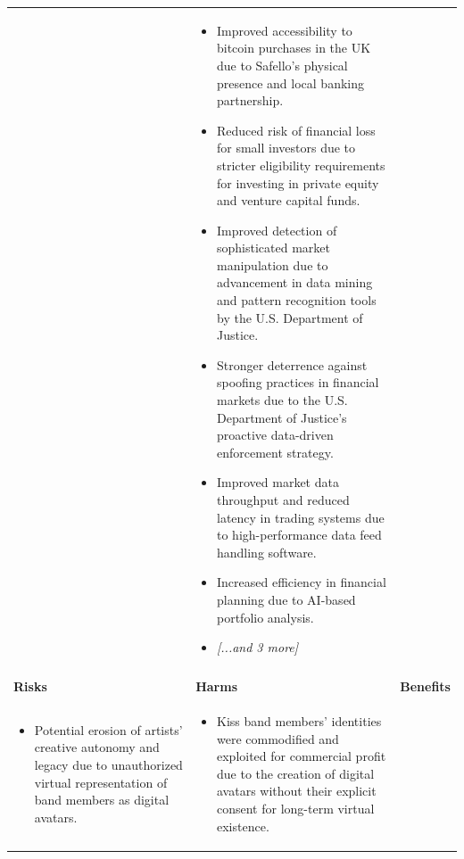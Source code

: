 \begin{longtable}{p{5.2cm}|p{5.2cm}|p{5.2cm}}
\begin{itemize}[leftmargin=*, nosep, before=\vspace{-0.5\baselineskip}, after=\vspace{-0.5\baselineskip}]
\end{itemize} & \begin{itemize}[leftmargin=*, nosep, before=\vspace{-0.5\baselineskip}, after=\vspace{-0.5\baselineskip}] 
\footnotesize
\item Improved accessibility to bitcoin purchases in the UK due to Safello's physical presence and local banking partnership.
\item Reduced risk of financial loss for small investors due to stricter eligibility requirements for investing in private equity and venture capital funds.
\item Improved detection of sophisticated market manipulation due to advancement in data mining and pattern recognition tools by the U.S. Department of Justice.
\item Stronger deterrence against spoofing practices in financial markets due to the U.S. Department of Justice's proactive data-driven enforcement strategy.
\item Improved market data throughput and reduced latency in trading systems due to high-performance data feed handling software.
\item Increased efficiency in financial planning due to AI-based portfolio analysis.
\item \textit{[...and 3 more]}
\end{itemize} \\
\pagebreak
\multicolumn{3}{l}{\textbf{\large Entrepreneurship} \textit{(N=22 articles)}} \\
\midrule
\textbf{Risks} & \textbf{Harms} & \textbf{Benefits} \\
\midrule
\begin{itemize}[leftmargin=*, nosep, before=\vspace{-0.5\baselineskip}, after=\vspace{-0.5\baselineskip}] 
\footnotesize
\item Potential erosion of artists' creative autonomy and legacy due to unauthorized virtual representation of band members as digital avatars.
\end{itemize} & \begin{itemize}[leftmargin=*, nosep, before=\vspace{-0.5\baselineskip}, after=\vspace{-0.5\baselineskip}] 
\footnotesize
\item Kiss band members' identities were commodified and exploited for commercial profit due to the creation of digital avatars without their explicit consent for long-term virtual existence.

\end{itemize}
\end{longtable}
